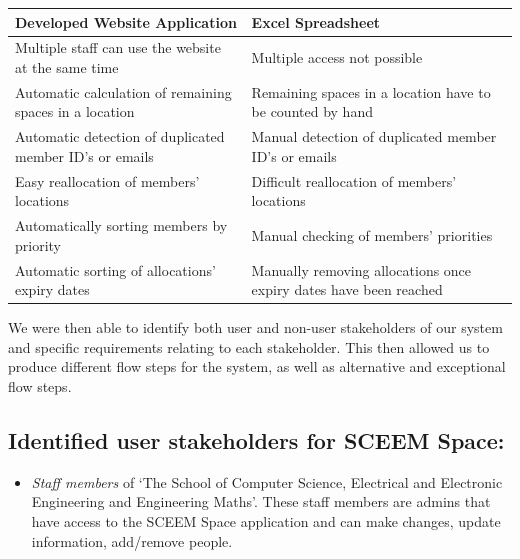 \documentclass[11pt,a4paper]{article}
\begin{document}
\begin{table}[ht]
\centering
\begin{tabular}{|p{}|p{}|}
\hline
Developed Website Application & Excel Spreadsheet  \\
\hline
Multiple staff can use the website at the same time & Multiple access not possible\\
Automatic calculation of remaining spaces in a location & Remaining spaces in a location have to be counted by hand\\
Automatic detection of duplicated member ID's or emails & Manual detection of duplicated member ID's or emails\\
Easy reallocation of members' locations & Difficult reallocation of members' locations\\
Automatically sorting members by priority & Manual checking of members' priorities\\
Automatic sorting of allocations' expiry dates & Manually removing allocations once expiry dates have been reached\\
\hline
\end{tabular}
\end{table}

We were then able to identify both user and non-user stakeholders of our system and specific requirements relating to each stakeholder. This then allowed us to produce different flow steps for the system, as well as alternative and exceptional flow steps.

\subsection{Identified user stakeholders for SCEEM Space:}
\begin{itemize}
    \item \textit{Staff members} of ‘The School of Computer Science, Electrical and Electronic Engineering and Engineering Maths’. These staff members are admins that have access to the SCEEM Space application and can make changes, update information, add/remove people.
\end{itemize}
\end{document}

